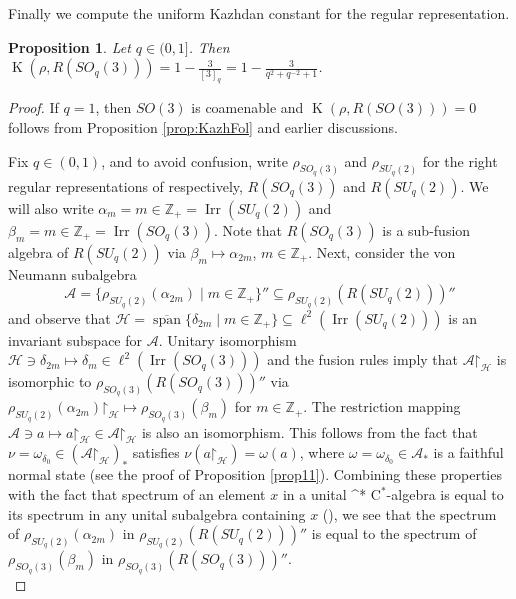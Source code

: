 \documentclass[11 pt, leqno]{amsart}
\newcommand{\ov}{\overline}
\newcommand{\mc}{\mathcal}
\newcommand{\cst}{\ifmmode \mathrm{C}^* \else $\mathrm{C}^*$\fi}
\newcommand{\ZZ}{\mathbb{Z}}
\renewcommand{\restriction}{\mathord{\upharpoonright}}
\DeclareMathOperator{\Kaz}{K}
\DeclareMathOperator{\lin}{span}
\DeclareMathOperator{\Irr}{Irr}
\newtheorem{proposition}[theorem]{Proposition}
\theoremstyle{definition}
\numberwithin{equation}{section}
\begin{document}
Finally we compute the uniform Kazhdan constant for the regular representation.


\begin{proposition} \label{prop:KazhdanSO}
	Let $q \in (0,1]$. Then $\Kaz(\rho,R(SO_q(3)))= 1 - \frac{3}{[3]_q} = 1-\tfrac{3}{q^2 +q^{-2}+1}$.
\end{proposition}

\begin{proof}
	If $q=1$, then $SO(3)$ is coamenable and $\Kaz(\rho,R(SO(3)))=0$ follows from Proposition \ref{prop:KazhFol} and earlier discussions.

Fix $q\in (0,1)$, and to avoid confusion, write $\rho_{SO_q(3)}$ and $\rho_{SU_q(2)}$ for the right regular representations of respectively, $R(SO_q(3))$ and $R(SU_q(2))$. We will also write $\alpha_m=m\in \ZZ_+=\Irr(SU_q(2))$ and $\beta_m=m\in \ZZ_+=\Irr(SO_q(3))$. Note that $R(SO_q(3))$ is a sub-fusion algebra of $R(SU_q(2))$ via $\beta_m\mapsto \alpha_{2m}$, $m \in \ZZ_+$. Next, consider the von Neumann subalgebra
\[
\mc{A}=\{\rho_{SU_q(2)} (\alpha_{2m})\mid m\in\ZZ_+\}''\subseteq 
\rho_{SU_q(2)} (R(SU_q(2)))''
\]
and observe that $\mc{H}=\ov{\lin}\{\delta_{2m}\mid m\in\ZZ_+\}\subseteq \ell^2(\Irr(SU_q(2)) )$ is an invariant subspace for $\mc{A}$. Unitary isomorphism $\mc{H}\ni \delta_{2m}\mapsto \delta_{m}\in \ell^2(\Irr(SO_q(3)) )$ and the fusion rules imply that $\mc{A}\restriction_{\mc{H}}$ is isomorphic to $\rho_{SO_q(3)}(R(SO_q(3)))''$ via $\rho_{SU_q(2)}(\alpha_{2m})\restriction_{\mc{H}}\mapsto \rho_{SO_q(3)}(\beta_m)$ for $m\in\ZZ_+$. The restriction mapping $\mc{A}\ni a\mapsto a\restriction_{\mc{H}}\in \mc{A}\restriction_{\mc{H}}$ is also an isomorphism. This follows from the fact that $\nu=\omega_{\delta_0}\in(\mc{A}\restriction_{\mc{H}})_*$ satisfies $\nu(a\restriction_{\mc{H}})=\omega(a)$, where $\omega=\omega_{\delta_0}\in \mc{A}_*$ is a faithful normal state (see the proof of Proposition \ref{prop11}). Combining these properties with the fact that spectrum of an element $x$ in a unital \cst-algebra is equal to its spectrum in any unital subalgebra containing $x$ (\cite[Corollary I.5.7]{Davidson}), we see that the spectrum of $\rho_{SU_q(2)}(\alpha_{2m})$ in $\rho_{SU_q(2)}(R(SU_q(2)))''$ is equal to the spectrum of $\rho_{SO_q(3)}(\beta_m)$ in $\rho_{SO_q(3)}(R(SO_q(3)))''$.\\


\end{proof}
\end{document}
